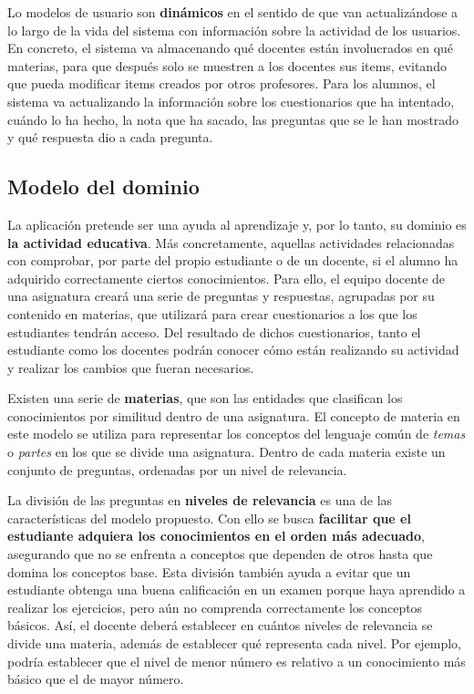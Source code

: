 Lo modelos de usuario son \textbf{dinámicos} en el sentido de que van  actualizándose a lo largo de la vida del sistema con información sobre la actividad de los usuarios. En concreto, el sistema va almacenando qué docentes están involucrados en qué materias, para que después solo se muestren a los docentes sus items, evitando que pueda modificar items creados por otros profesores. Para los alumnos, el sistema va actualizando la información sobre los cuestionarios que ha intentado, cuándo lo ha hecho, la nota que ha sacado, las preguntas que se le han mostrado y qué respuesta dio a cada pregunta.

\subsection{Modelo del dominio}

La aplicación pretende ser una ayuda al aprendizaje y, por lo tanto, su dominio es \textbf{la actividad educativa}. Más concretamente, aquellas actividades relacionadas con comprobar, por parte del propio estudiante o de un docente, si el alumno ha adquirido correctamente ciertos conocimientos. Para ello, el equipo docente de una asignatura creará una serie de preguntas y respuestas, agrupadas por su contenido en materias, que utilizará para crear cuestionarios a los que los estudiantes tendrán acceso. Del resultado de dichos cuestionarios, tanto el estudiante como los docentes podrán conocer cómo están realizando su actividad y realizar los cambios que fueran necesarios.

Existen una serie de \textbf{materias}, que son las entidades que clasifican los conocimientos por similitud dentro de una asignatura. El concepto de materia en este modelo se utiliza para representar los conceptos del lenguaje común de \emph{temas} o \emph{partes} en los que se divide una asignatura. Dentro de cada materia existe un conjunto de preguntas, ordenadas por un nivel de relevancia.

La división de las preguntas en \textbf{niveles de relevancia} es una de las características del modelo propuesto. Con ello se busca \textbf{facilitar que el estudiante adquiera los conocimientos en el orden más adecuado}, asegurando que no se enfrenta a conceptos que dependen de otros hasta que domina los conceptos base. Esta división también ayuda a evitar que un estudiante obtenga una buena calificación en un examen porque haya aprendido a realizar los ejercicios, pero aún no comprenda correctamente los conceptos básicos. Así, el docente deberá establecer en cuántos niveles de relevancia se divide una materia, además de establecer qué representa cada nivel. Por ejemplo, podría establecer que el nivel de menor número es relativo a un conocimiento más básico que el de mayor número.


